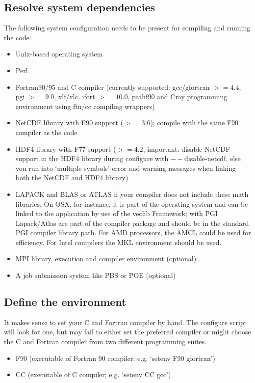 \documentclass[a4paper,12pt]{article}
\begin{document}
\subsection{Resolve system dependencies}
The following system configuration needs to be present for compiling and running the code:
\begin{itemize}
\item Unix-based operating system 
\item Perl
\item Fortran90/95 and C compiler (currently supported: gcc/gfortran $>=4.4$, pgi $>=9.0$, xlf/xlc, ifort $>=10.0$, pathf90 and Cray programming environment using ftn/cc compiling wrappers)
\item NetCDF library with F90 support ($>=3.6$); compile with the same F90 compiler as the code
\item HDF4 library with F77 support ($>=4.2$, important: disable NetCDF support in the HDF4 library during configure with $--$disable-netcdf, else you run into `multiple symbols' error and warning messages when linking both the NetCDF and HDF4 library) 
\item LAPACK and BLAS or ATLAS if your compiler does not include these math libraries. On OSX, for instance, it is part of the operating system and can be linked to the application by use of the veclib Framework; with PGI Lapack/Atlas are part of the compiler package and should be in the standard PGI compiler library path. For AMD processors, the AMCL could be used for efficiency. For Intel compilers the MKL environment should be used.
\item MPI library, execution and compiler environment (optional)
\item A job submission system like PBS or POE (optional)
\end{itemize}

\subsection{Define the environment}
It makes sense to set your C and Fortran compiler by hand. The configure script will look for one, but may fail to either set the preferred compiler or might choose the C and Fortran compiler from two different programming suites.
\begin{itemize}
\item F90  (executable of Fortran 90 compiler; e.g. `setenv F90 gfortran')
\item CC   (executable of C compiler; e.g. `setenv CC gcc')
\end{itemize}
\end{document}
